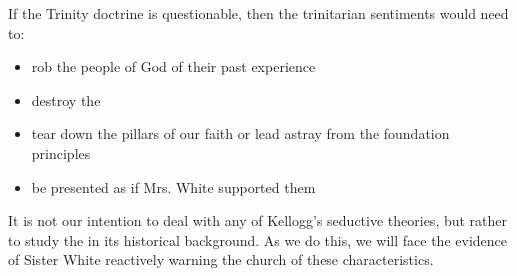 If the Trinity doctrine is questionable, then the trinitarian sentiments would need to:
\begin{itemize}
    \item rob the people of God of their past experience
    \item destroy the 
    \item tear down the pillars of our faith or lead astray from the foundation principles
    \item be presented as if Mrs. White supported them
\end{itemize}

It is not our intention to deal with any of Kellogg’s seductive theories, but rather to study the  in its historical background. As we do this, we will face the evidence of Sister White reactively warning the church of these characteristics.

